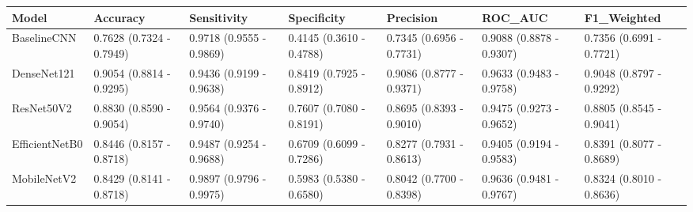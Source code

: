 \begin{tabular}{lllllll}
\toprule
Model & Accuracy & Sensitivity & Specificity & Precision & ROC_AUC & F1_Weighted \\
\midrule
BaselineCNN & 0.7628 (0.7324 - 0.7949) & 0.9718 (0.9555 - 0.9869) & 0.4145 (0.3610 - 0.4788) & 0.7345 (0.6956 - 0.7731) & 0.9088 (0.8878 - 0.9307) & 0.7356 (0.6991 - 0.7721) \\
DenseNet121 & 0.9054 (0.8814 - 0.9295) & 0.9436 (0.9199 - 0.9638) & 0.8419 (0.7925 - 0.8912) & 0.9086 (0.8777 - 0.9371) & 0.9633 (0.9483 - 0.9758) & 0.9048 (0.8797 - 0.9292) \\
ResNet50V2 & 0.8830 (0.8590 - 0.9054) & 0.9564 (0.9376 - 0.9740) & 0.7607 (0.7080 - 0.8191) & 0.8695 (0.8393 - 0.9010) & 0.9475 (0.9273 - 0.9652) & 0.8805 (0.8545 - 0.9041) \\
EfficientNetB0 & 0.8446 (0.8157 - 0.8718) & 0.9487 (0.9254 - 0.9688) & 0.6709 (0.6099 - 0.7286) & 0.8277 (0.7931 - 0.8613) & 0.9405 (0.9194 - 0.9583) & 0.8391 (0.8077 - 0.8689) \\
MobileNetV2 & 0.8429 (0.8141 - 0.8718) & 0.9897 (0.9796 - 0.9975) & 0.5983 (0.5380 - 0.6580) & 0.8042 (0.7700 - 0.8398) & 0.9636 (0.9481 - 0.9767) & 0.8324 (0.8010 - 0.8636) \\
\bottomrule
\end{tabular}
